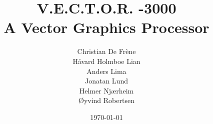 
\newcommand{\mytitle}{V.E.C.T.O.R. -3000 \\ \vspace{0.5cm} A Vector Graphics Processor}
\newcommand{\myauthor}{Christian De Frène\\Håvard Holmboe Lian\\Anders Lima\\Jonatan Lund\\Helmer Njærheim\\Øyvind Robertsen\\}

\title{\mytitle}
\author{\myauthor}
\date{\today}
